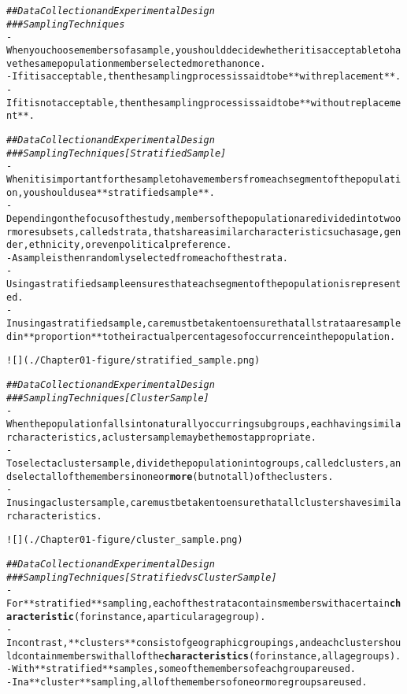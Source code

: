\documentclass{article}\usepackage[]{graphicx}\usepackage[]{color}
\makeatletter
\newcommand{\hlcom}[1]{\textcolor[rgb]{0.678,0.584,0.686}{\textit{#1}}}%
\newcommand{\hlkwd}[1]{\textcolor[rgb]{0.737,0.353,0.396}{\textbf{#1}}}%
\newenvironment{kframe}{%
 \def\at@end@of@kframe{}%
 \ifinner\ifhmode%
  \def\at@end@of@kframe{\end{minipage}}%
  \begin{minipage}{\columnwidth}%
 \fi\fi%
 \def\FrameCommand##1{\hskip\@totalleftmargin \hskip-\fboxsep
 \colorbox{shadecolor}{##1}\hskip-\fboxsep
     \hskip-\linewidth \hskip-\@totalleftmargin \hskip\columnwidth}%
 \MakeFramed {\advance\hsize-\width
   \@totalleftmargin\z@ \linewidth\hsize
   \@setminipage}}%
 {\par\unskip\endMakeFramed%
 \at@end@of@kframe}
\newenvironment{knitrout}{}{} %
\makeatother
\begin{document}
\begin{knitrout}
\begin{kframe}
\begin{alltt}
\hlcom{## Data Collection and Experimental Design}
\hlcom{### Sampling Techniques}
- When you choose members of a sample, you should decide whether it is acceptable to have the same population member selected more than once. 
- If it is acceptable, then the sampling process is said to be **with replacement**. 
- If it is not acceptable, then the sampling process is said to be **without replacement**.

\hlcom{## Data Collection and Experimental Design}
\hlcom{### Sampling Techniques [Stratified Sample]}
- When it is important for the sample to have members from each segment of the population, you should use a **stratified sample**.
- Depending on the focus of the study, members of the population are divided into two or more subsets, called strata, that share a similar characteristic such as age, gender, ethnicity, or even political preference. 
- A sample is then randomly selected from each of the strata. 
- Using a stratified sample ensures that each segment of the population is represented.
- In using a stratified sample, care must be taken to ensure that all strata are sampled in **proportion** to their actual percentages of occurrence in the population.

![](./Chapter01-figure/stratified_sample.png)

\hlcom{## Data Collection and Experimental Design}
\hlcom{### Sampling Techniques [Cluster Sample]}
- When the population falls into naturally occurring subgroups, each having similar characteristics, a cluster sample may be the most appropriate.
- To select a cluster sample, divide the population into groups, called clusters, and select all of the members in one or \hlkwd{more} (but not all) of the clusters.
- In using a cluster sample, care must be taken to ensure that all clusters have similar characteristics.

![](./Chapter01-figure/cluster_sample.png)

\hlcom{## Data Collection and Experimental Design}
\hlcom{### Sampling Techniques [Stratified vs Cluster Sample]}
- For **stratified** sampling, each of the strata contains members with a certain \hlkwd{characteristic} (for instance, a particular age group).
- In contrast, **clusters** consist of geographic groupings, and each cluster should contain members with all of the \hlkwd{characteristics} (for instance, all age groups). 
- With **stratified** samples, some of the members of each group are used. 
- In a **cluster** sampling, all of the members of one or more groups are used.


\end{alltt}
\end{kframe}
\end{knitrout}
\end{document}
